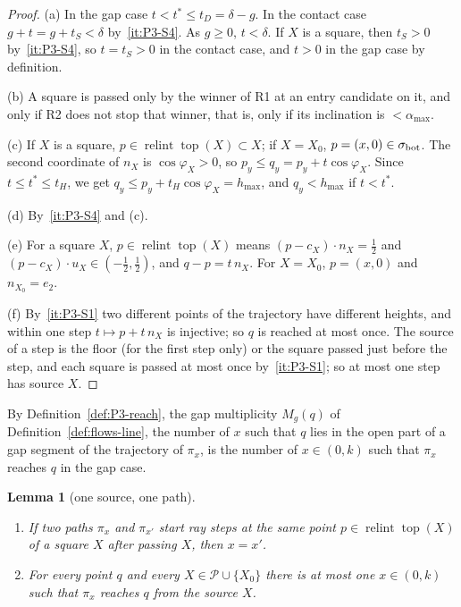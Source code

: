 \documentclass[11pt]{amsart}
\newcommand{\cP}{\mathcal P}
\newcommand{\relint}{\operatorname{relint}}
\newcommand{\Top}{\operatorname{top}}
\newcommand{\amax}{\alpha_{\max}}
\newcommand{\hmax}{h_{\max}}
\newtheorem{lemma}[theorem]{Lemma}
\theoremstyle{definition}
\theoremstyle{remark}
\numberwithin{equation}{section}
\begin{document}
\begin{proof}
(a) In the gap case $t<t^*\le t_D=\delta-g$. In the contact case $g+t=g+t_S<\delta$ by~\ref{it:P3-S4}. As $g\ge0$, $t<\delta$. If $X$ is a square, then $t_S>0$ by~\ref{it:P3-S4}, so $t=t_S>0$ in the contact case, and $t>0$ in the gap case by definition.

(b) A square is passed only by the winner of R1 at an entry candidate on it, and only if R2 does not stop that winner, that is, only if its inclination is $<\amax$.

(c) If $X$ is a square, $p\in\relint\Top(X)\subset X$; if $X=X_0$, $p=(x,0)\in\sigma_{\rm bot}$. The second coordinate of $n_X$ is $\cos\varphi_X>0$, so $p_y\le q_y=p_y+t\cos\varphi_X$. Since $t\le t^*\le t_H$, we get $q_y\le p_y+t_H\cos\varphi_X=\hmax$, and $q_y<\hmax$ if $t<t^*$.

(d) By~\ref{it:P3-S4} and (c).

(e) For a square $X$, $p\in\relint\Top(X)$ means $(p-c_X)\cdot n_X=\frac12$ and $(p-c_X)\cdot u_X\in(-\frac12,\frac12)$, and $q-p=t\,n_X$. For $X=X_0$, $p=(x,0)$ and $n_{X_0}=e_2$.

(f) By~\ref{it:P3-S1} two different points of the trajectory have different heights, and within one step $t\mapsto p+t\,n_X$ is injective; so $q$ is reached at most once. The source of a step is the floor (for the first step only) or the square passed just before the step, and each square is passed at most once by~\ref{it:P3-S1}; so at most one step has source $X$.
\end{proof}

By Definition~\ref{def:P3-reach}, the gap multiplicity $M_g(q)$ of Definition~\ref{def:flows-line}, the number of $x$ such that $q$ lies in the open part of a gap segment of the trajectory of $\pi_x$, is the number of $x\in(0,k)$ such that $\pi_x$ reaches $q$ in the gap case.

\begin{lemma}[one source, one path]\label{lem:P3-samesource}
\begin{enumerate}[label=(\alph*)]
\item If two paths $\pi_x$ and $\pi_{x'}$ start ray steps at the same point $p\in\relint\Top(X)$ of a square $X$ after passing $X$, then $x=x'$.
\item For every point $q$ and every $X\in\cP\cup\{X_0\}$ there is at most one $x\in(0,k)$ such that $\pi_x$ reaches $q$ from the source $X$.
\end{enumerate}
\end{lemma}
\end{document}
